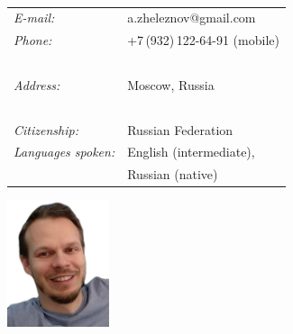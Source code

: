\documentclass[a4paper,oneside,12pt]{article}
\begin{document}
\begin{centering}
\begin{minipage}{0.70\linewidth}%
\vspace{-1.5em}{\Huge\bfseries Alexander Zheleznov}

~\\[-1.5em]

\hspace{1.9em}\begin{tabularx}{\linewidth}{ll}
{\it E-mail:}		& a.zheleznov@gmail.com\\
{\it Phone:}	        & +7\,(932)\,122-64-91 (mobile)\\
~\\[-1.0em] 
{\it Address:}	    %
                    & Moscow, Russia\\

~\\[-1.0em]
{\it Citizenship:}   & Russian Federation\\
{\it Languages spoken:}& English (intermediate),\\ 
		       &Russian (native)\\
\end{tabularx}
\end{minipage}
\begin{minipage}{0.23\linewidth}%
\begin{flushright}
\includegraphics[width=30mm]{me.jpg}
{%
\setlength{\fboxsep}{0pt}%
\setlength{\fboxrule}{0pt}%
\fbox{
}
}%
\end{flushright}
\end{minipage}
\end{centering}
~\\[1.5em]
\end{document}
